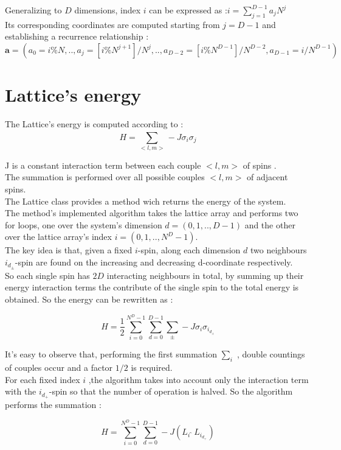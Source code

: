 \documentclass[11pt,a4paper]{article}
\begin{document}
Generalizing to $D$ dimensions, index $i$ can be expressed as :$ i = \sum_{j=1}^{D-1}a_jN^j $ \\
Its corresponding coordinates are computed starting from $j=D-1$ and establishing a recurrence relationship :
$$\mathbf{a} = \left(a_0 = i\%N ,.., a_j = [i\%N^{j+1}]/N^j ,.., a_{D-2} = [i\% N^{D-1}]/N^{D-2} , a_{D-1} = i/N^{D-1}\right)$$ 
 
\section*{Lattice's energy } 

The Lattice's energy is computed according to : 
$$H = \sum_{<l,m>}^{} -J\sigma_i\sigma_j $$

J is a constant interaction term between each couple $<l,m>$ of spins .\\
The summation is performed over all possible couples $<l,m>$ of adjacent spins.\\

The Lattice class provides a method wich returns the energy of the system. \\
The method's implemented algorithm takes the lattice array and performs two for loops, one over the system's dimension $d = (0,1,..,D-1)$ and the other over the lattice array's index $i = (0,1,..,N^D-1)$. \\
The key idea is that, given a fixed $i$-spin, along each dimension $d$ two neighbours $i_{d_\pm}$-spin are found on the increasing and decreasing d-coordinate respectively. 
\\So each single spin has $2D$ interacting neighbours in total, by summing up their energy interaction terms the contribute of the single spin to the total energy is obtained. So the energy can be rewritten as : 

$$H = \frac{1}{2}\sum_{i=0}^{N^D-1}\sum_{d=0}^{D-1}\sum_{\pm}^{} -J\sigma_i\sigma_{i_{d_\pm}}$$ 

It's easy to observe that, performing the first summation $\sum_{i}^{}$ , double countings of couples occur and a factor $1/2$ is required. \\ 
For each fixed index $i$ ,the algorithm takes into account only the interaction term with the 
$i_{d_+}$-spin so that the number of operation is halved. So the algorithm performs the summation :
  
$$H = \sum_{i=0}^{N^D-1}\sum_{d=0}^{D-1}-J(L_i \ \hat{} \ L_{i_{d_+}})$$ 
\end{document}
